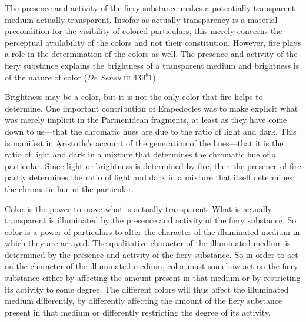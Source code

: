 The presence and activity of the fiery substance makes a potentially transparent medium actually transparent. Insofar as actually transparency is a material precondition for the visibility of colored particulars, this merely concerns the perceptual availability of the colors and not their constitution. However, fire plays a role in the determination of the colors as well. The presence and activity of the fiery substance explains the brightness of a transparent medium and brightness is of the nature of color (\emph{De Sensu} \textsc{iii} 439\( ^{b} \)1). 

Brightness may be a color, but it is not the only color that fire helps to determine. One important contribution of Empedocles was to make explicit what was merely implicit in the Parmenidean fragments, at least as they have come down to us---that the chromatic hues are due to the ratio of light and dark. This is manifest in Aristotle's account of the generation of the hues---that it is the ratio of light and dark in a mixture that determines the chromatic hue of a particular. Since light or brightness is determined by fire, then the presence of fire partly determines the ratio of light and dark in a mixture that itself determines the chromatic hue of the particular.

Color is the power to move what is actually transparent. What is actually transparent is illuminated by the presence and activity of the fiery substance. So color is a power of particulars to alter the character of the illuminated medium in which they are arrayed. The qualitative character of the illuminated medium is determined by the presence and activity of the fiery substance. So in order to act on the character of the illuminated medium, color must somehow act on the fiery substance either by affecting the amount present in that medium or by restricting its activity to some degree. The different colors will thus affect the illuminated medium differently, by differently affecting the amount of the fiery substance present in that medium or differently restricting the degree of its activity.




